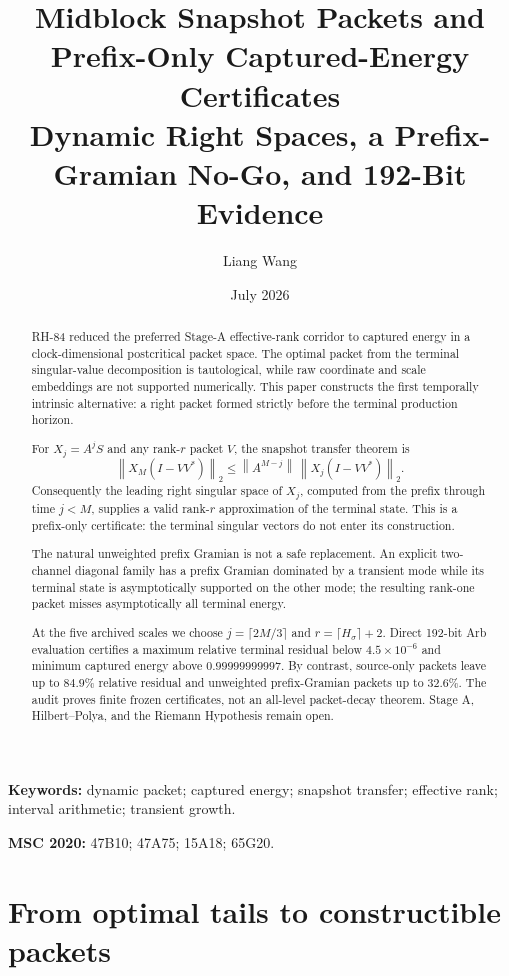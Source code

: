 \documentclass[11pt]{article}
\title{Midblock Snapshot Packets and Prefix-Only Captured-Energy Certificates\\
\large Dynamic Right Spaces, a Prefix-Gramian No-Go, and 192-Bit Evidence}
\author{Liang Wang}
\date{July 2026}
\theoremstyle{remark}
\newcommand{\norm}[1]{\left\lVert#1\right\rVert}
\begin{document}
\maketitle

\begin{abstract}
RH-84 reduced the preferred Stage-A effective-rank corridor to captured
energy in a clock-dimensional postcritical packet space.  The optimal packet
from the terminal singular-value decomposition is tautological, while raw
coordinate and scale embeddings are not supported numerically.  This paper
constructs the first temporally intrinsic alternative: a right packet formed
strictly before the terminal production horizon.

For $X_j=A^jS$ and any rank-$r$ packet $V$, the snapshot transfer theorem is
\[
 \norm{X_M(I-VV^*)}_2
 \le \norm{A^{M-j}}\,\norm{X_j(I-VV^*)}_2.
\]
Consequently the leading right singular space of $X_j$, computed from the
prefix through time $j<M$, supplies a valid rank-$r$ approximation of the
terminal state.  This is a prefix-only certificate: the terminal singular
vectors do not enter its construction.

The natural unweighted prefix Gramian is not a safe replacement.  An explicit
two-channel diagonal family has a prefix Gramian dominated by a transient
mode while its terminal state is asymptotically supported on the other mode;
the resulting rank-one packet misses asymptotically all terminal energy.

At the five archived scales we choose $j=\lceil2M/3\rceil$ and
$r=\lceil H_\sigma\rceil+2$.  Direct 192-bit Arb evaluation certifies a
maximum relative terminal residual below $4.5\times10^{-6}$ and minimum
captured energy above $0.99999999997$.  By contrast, source-only packets leave
up to $84.9\%$ relative residual and unweighted prefix-Gramian packets up to
$32.6\%$.  The audit proves finite frozen certificates, not an all-level
packet-decay theorem.  Stage A, Hilbert--Polya, and the Riemann Hypothesis
remain open.
\end{abstract}

\noindent\textbf{Keywords:} dynamic packet; captured energy; snapshot
transfer; effective rank; interval arithmetic; transient growth.

\medskip
\noindent\textbf{MSC 2020:} 47B10; 47A75; 15A18; 65G20.

\section{From optimal tails to constructible packets}
\end{document}
